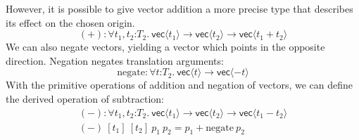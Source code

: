 However, it is possible to give vector addition a more precise type
that describes its effect on the chosen origin. 
\begin{displaymath}
  (+) : \forall t_1, t_2 \mathord: T_2.\ \mathsf{vec}\langle t_1\rangle \to \mathsf{vec}\langle t_2 \rangle \to \mathsf{vec}\langle t_1 + t_2 \rangle
\end{displaymath}
We can also negate vectors, yielding a vector which points in the
opposite direction. Negation negates translation arguments:
\begin{displaymath}
  \mathrm{negate} : \forall t \mathord: T_2.\ \mathsf{vec}\langle t \rangle \to \mathsf{vec}\langle -t \rangle
\end{displaymath}
With the primitive operations of addition and negation of vectors, we
can define the derived operation of subtraction:
\begin{displaymath}
  \begin{array}{l}
    (-) : \forall t_1,t_2 \mathord:T_2.\ \mathsf{vec}\langle t_1\rangle \to \mathsf{vec}\langle t_2\rangle \to \mathsf{vec}\langle t_1 - t_2 \rangle \\
    (-)\ [t_1]\ [t_2]\ p_1\ p_2 = p_1 + \mathrm{negate}\ p_2
  \end{array}
\end{displaymath}

